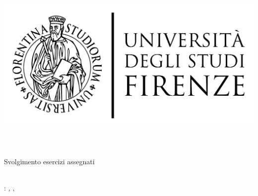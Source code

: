 \begin{titlepage}
	\begin{center}
   	\large
      \hfill
      \vfill
      \begingroup
         \includegraphics[scale=0.15]{logo/LOGO}\\
			\spacedallcaps{\myUni} \\ 
			\myFaculty \\
			\myDegree \\ 
			\vspace{0.5cm}
         \vspace{0.5cm}    
         Svolgimento esercizi assegnati    
      \endgroup 
      \vfill 
      \begingroup
      	\color{Maroon}\spacedallcaps{\myItalianTitle} \\ $\ $\\
	\bigskip
      \endgroup
      \spacedlowsmallcaps{\myName}
      \vfill 
      \vfill
      \emph{\myProf}
      \vfill
      \vfill
      \myTime
      \vfill                      
	\end{center}        
\end{titlepage}   
   \newpage
	\thispagestyle{empty}
	\hfill
	\vfill
	\noindent\myName: 
	\textit{\myItalianTitle,} 
	\myDegree, 
	\myTime
